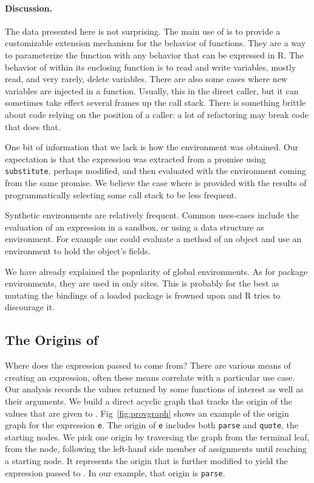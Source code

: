 \documentclass[review,screen,acmsmall]{acmart}%
\renewcommand{\k}[1]{\lstinline |#1|\xspace}
\begin{document}
\paragraph{Discussion.}
The data presented here is not surprising. The main use of \eval is to provide a
customizable extension mechanism for the behavior of functions. They are a way
to parameterize the function with any behavior that can be expressed in R. The
behavior of \eval within its enclosing function is to read and write variables,
mostly read, and very rarely, delete variables. There are also some cases where
new variables are injected in a function. Usually, this in the direct caller,
but it can sometimes take effect several frames up the call stack. There is
something brittle about code relying on the position of a caller: a lot of
refactoring may break code that does that.

One bit of information that we lack is how the environment was obtained. Our
expectation is that the expression was extracted from a promise using
\k{substitute}, perhaps modified, and then evaluated with the environment coming
from the same promise. We believe the case where \eval is provided with the results
of programmatically selecting some call stack to be less frequent.

Synthetic environments are relatively frequent. Common uses-cases include
the evaluation of an expression in a sandbox, or using a data structure as
environment. For example one could evaluate a method of an object and use an
environment to hold the object's fields.

We have already explained the popularity of global environments. As for package
environments, they are used in only \packageNbPackageNamespaceEnvSites sites.
This is probably for the best as mutating the bindings of a loaded package is
frowned upon and R tries to discourage it.

\subsection{The Origins of \Eval}

Where does the expression passed to \eval come from? There are various means of
creating an expression, often these means correlate with a particular use case.
Our analysis records the values returned by some functions of interest as well
as their arguments. We build a direct acyclic graph that tracks the origin
of the values that are given to \eval. Fig~\ref{fig:provgraph} shows an example
of the origin graph for the expression \k{e}.
The origin of \k{e} includes both \k{parse} and \k{quote}, the starting nodes. We pick one origin by traversing the graph from the terminal leaf, \ie from the \eval node, following the left-hand side
member of assignments until reaching a starting node. It represents the origin that is
further modified to yield the expression passed to \eval. In our example, that
origin is \k{parse}.
\end{document}

